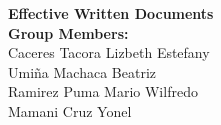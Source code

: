 \documentclass{beamer}
\begin{document}
\begin{frame}{}
\centering
\vspace{1.5cm}

{\Huge \textbf{Effective Written Documents}}\\[1em]



{\normalsize
\textbf{Group Members:} \\[0.5em]
Caceres Tacora Lizbeth Estefany \\ 
Umiña Machaca Beatriz\\
Ramirez Puma Mario Wilfredo\\
Mamani Cruz Yonel \\

}
\end{frame}





\end{document}
